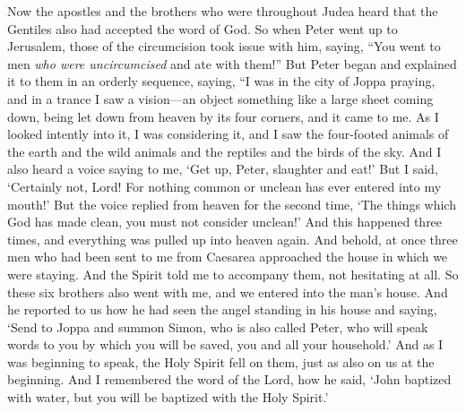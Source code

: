 \begin{biblechapter} %
 Now the apostles and the brothers who were throughout Judea heard that the Gentiles also had accepted the word of God.
\verse So when Peter went up to Jerusalem, those of the circumcision took issue with him,
\verse saying, “You went to men \textit{who were uncircumcised} and ate with them!”
\verse But Peter began and explained it to them in an orderly sequence, saying,
\verse “I was in the city of Joppa praying, and in a trance I saw a vision—an object something like a large sheet coming down, being let down from heaven by its four corners, and it came to me.
\verse As I looked intently into it, I was considering it, and I saw the four-footed animals of the earth and the wild animals and the reptiles and the birds of the sky.
\verse And I also heard a voice saying to me, ‘Get up, Peter, slaughter and eat!’
\verse But I said, ‘Certainly not, Lord! For nothing common or unclean has ever entered into my mouth!’
\verse But the voice replied from heaven for the second time, ‘The things which God has made clean, you must not consider unclean!’
\verse And this happened three times, and everything was pulled up into heaven again.
\verse And behold, at once three men who had been sent to me from Caesarea approached the house in which we were staying.
\verse And the Spirit told me to accompany them, not hesitating at all. So these six brothers also went with me, and we entered into the man’s house.
\verse And he reported to us how he had seen the angel standing in his house and saying, ‘Send to Joppa and summon Simon, who is also called Peter,
\verse who will speak words to you by which you will be saved, you and all your household.’
\verse And as I was beginning to speak, the Holy Spirit fell on them, just as also on us at the beginning.
\verse And I remembered the word of the Lord, how he said, ‘John baptized with water, but you will be baptized with the Holy Spirit.’

\end{biblechapter}
